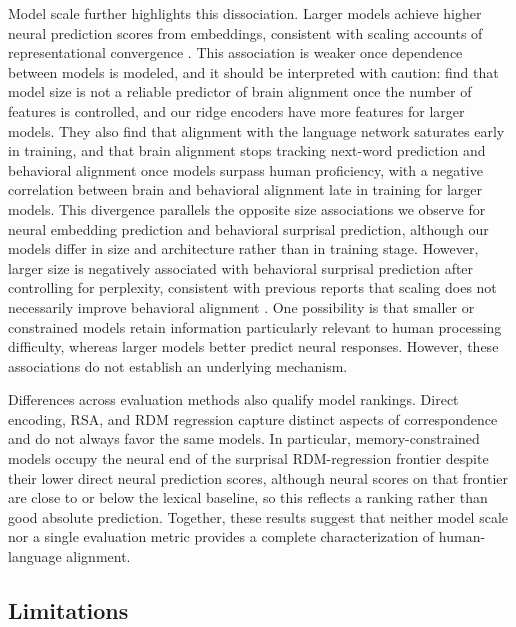 Model scale further highlights this dissociation. Larger models achieve higher neural prediction scores from embeddings, consistent with scaling accounts of representational convergence \citep{huh2024platonic,shain2024large}. This association is weaker once dependence between models is modeled, and it should be interpreted with caution: \citet{alkhamissi-etal-2025-language} find that model size is not a reliable predictor of brain alignment once the number of features is controlled, and our ridge encoders have more features for larger models. They also find that alignment with the language network saturates early in training, and that brain alignment stops tracking next-word prediction and behavioral alignment once models surpass human proficiency, with a negative correlation between brain and behavioral alignment late in training for larger models. This divergence parallels the opposite size associations we observe for neural embedding prediction and behavioral surprisal prediction, although our models differ in size and architecture rather than in training stage. However, larger size is negatively associated with behavioral surprisal prediction after controlling for perplexity, consistent with previous reports that scaling does not necessarily improve behavioral alignment \citep{ohschuler2023why,ohschuler2023twobillion,kuribayashi2021lower,devarda2026behavioral}. One possibility is that smaller or constrained models retain information particularly relevant to human processing difficulty, whereas larger models better predict neural responses. However, these associations do not establish an underlying mechanism.

Differences across evaluation methods also qualify model rankings. Direct encoding, RSA, and RDM regression capture distinct aspects of correspondence and do not always favor the same models. In particular, memory-constrained models occupy the neural end of the surprisal RDM-regression frontier despite their lower direct neural prediction scores, although neural scores on that frontier are close to or below the lexical baseline, so this reflects a ranking rather than good absolute prediction. Together, these results suggest that neither model scale nor a single evaluation metric provides a complete characterization of human-language alignment.

\subsection{Limitations}

